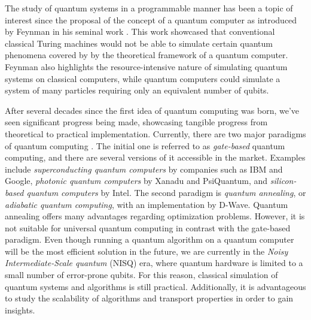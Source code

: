 \documentclass[../../main.tex]{subfiles}
\begin{document}

The study of quantum systems in a programmable manner has been a topic of
interest since the proposal of the concept of a quantum computer as introduced
by Feynman in his seminal work \cite{feynman1982}. This work showcased that
conventional classical Turing machines would not be able to simulate certain
quantum phenomena covered by by the theoretical framework of a quantum
computer. Feynman also highlights the resource-intensive nature of simulating
quantum systems on classical computers, while quantum computers could simulate
a system of many particles requiring only an equivalent number of qubits.\par

After several decades since the first idea of quantum computing was born, we've
seen significant progress being made, showcasing tangible progress from
theoretical to practical implementation. Currently, there are two major
paradigms of quantum computing \cite{willschLecture22}. The initial one is
referred to as \textit{gate-based} quantum computing, and there are several
versions of it accessible in the market. Examples include
\textit{superconducting quantum computers} by companies such as IBM and Google,
\textit{photonic quantum computers} by Xanadu and PsiQuantum, and
\textit{silicon-based quantum computers} by Intel. The second paradigm is
\textit{quantum annealing}, or \textit{adiabatic quantum computing}, with an
implementation by D-Wave. Quantum annealing offers many advantages regarding
optimization problems. However, it is not suitable for universal quantum
computing in contrast with the gate-based paradigm. Even though running a
quantum algorithm on a quantum computer will be the most efficient solution in
the future, we are currently in the \textit{Noisy Intermediate-Scale quantum}
(NISQ) era, where quantum hardware is limited to a small number of error-prone
qubits. For this reason, classical simulation of quantum systems and algorithms
is still practical. Additionally, it is advantageous to study the scalability
of algorithms and transport properties in order to gain insights.\par
\end{document}
